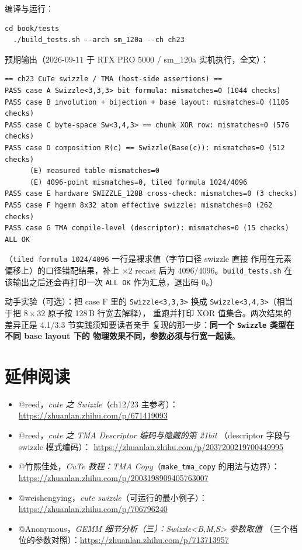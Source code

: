 编译与运行：

\begin{lstlisting}[style=console]
  cd book/tests
  ./build_tests.sh --arch sm_120a --ch ch23
\end{lstlisting}

预期输出（$2026$-$09$-$11$ 于 RTX PRO 5000 / sm\_120a 实机执行，全文）：

\begin{lstlisting}[style=console]
== ch23 CuTe swizzle / TMA (host-side assertions) ==
PASS case A Swizzle<3,3,3> bit formula: mismatches=0 (1044 checks)
PASS case B involution + bijection + base layout: mismatches=0 (1105 checks)
PASS case C byte-space Sw<3,4,3> == chunk XOR row: mismatches=0 (576 checks)
PASS case D composition R(c) == Swizzle(Base(c)): mismatches=0 (512 checks)
      (E) measured table mismatches=0
      (E) 4096-point mismatches=0, tiled formula 1024/4096
PASS case E hardware SWIZZLE_128B cross-check: mismatches=0 (3 checks)
PASS case F hgemm 8x32 atom effective swizzle: mismatches=0 (262 checks)
PASS case G TMA compile-level (descriptor): mismatches=0 (15 checks)
ALL OK
\end{lstlisting}
（\texttt{tiled formula 1024/4096} 一行是裸求值（字节口径 swizzle 直接
作用在元素偏移上）的口径错配结果，补上 $\times2$ recast 后为
$4096/4096$。\texttt{build\_\allowbreak{}tests.\allowbreak{}sh} 在该输出之后还会再打印一次
\texttt{ALL OK} 作为汇总，退出码 $0$。）

动手实验（可选）：把 case F 里的 \texttt{Swizzle\allowbreak{}<3,\allowbreak{}3,\allowbreak{}3>} 换成
\texttt{Swizzle\allowbreak{}<3,\allowbreak{}4,\allowbreak{}3>}（相当于把 $8\times32$ 原子按 128\,B 行宽去解释），
重跑并打印 XOR 值集合。两次结果的差异正是 4.1/3.3 节实践须知要读者亲手
复现的那一步：\textbf{同一个 \texttt{Swizzle} 类型在不同 base layout 下的
物理效果不同，参数必须与行宽一起读}。

\section*{延伸阅读}

\begin{itemize}[leftmargin=1.6em]
\item @reed，\emph{cute 之 Swizzle}（ch12/23 主参考）：
\url{https://zhuanlan.zhihu.com/p/671419093}
\item @reed，\emph{cute 之 TMA Descriptor 编码与隐藏的第 21bit}
（descriptor 字段与 swizzle 模式编码）：
\url{https://zhuanlan.zhihu.com/p/2037200219700449995}
\item @竹熙佳处，\emph{CuTe 教程：TMA Copy}（\texttt{make\_\allowbreak{}tma\_\allowbreak{}copy}
的用法与边界）：
\url{https://zhuanlan.zhihu.com/p/2003198909405763007}
\item @weishengying，\emph{cute swizzle}（可运行的最小例子）：
\url{https://zhuanlan.zhihu.com/p/706796240}
\item @Anonymous，\emph{GEMM 细节分析（三）：Swizzle<B,M,S> 参数取值}
（三个档位的参数对照）：\url{https://zhuanlan.zhihu.com/p/713713957}
\end{itemize}
